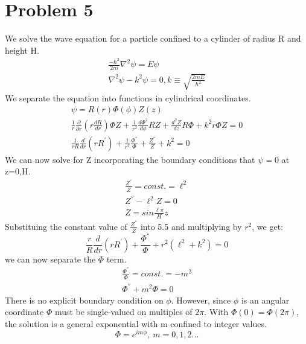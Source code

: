 \documentclass[a4paper,10pt]{article}
\numberwithin{equation}{section}
\begin{document}
\section{Problem 5}
We solve the wave equation for a particle confined to a cylinder of radius R and height H.
\begin{gather}
\frac{-\hbar ^2}{2m} \nabla ^2 \psi=E \psi\\
\nabla ^2 \psi -k^2\psi=0, k\equiv \sqrt{\frac{2mE}{\hbar ^2}}
\end{gather}
We separate the equation into functions in cylindrical coordinates.
\begin{gather}
 \psi=R(r)\Phi(\phi)Z(z)\\
 \frac{1}{r}\frac{\partial}{\partial r}(r\frac{dR}{dr})\Phi Z+\frac{1}{r^2}\frac{d \Phi ^2}{d \phi }RZ+\frac{d^2Z}{dz}R\Phi +k^2r\Phi Z=0\\
 \frac{1}{rR}\frac{d}{dr}(rR^{'} )+\frac{1}{r^2}\frac{\Phi^{''} }{\Phi}+\frac{Z^{''}}{Z}+k^2=0
\end{gather}
We can now solve for Z incorporating the boundary conditions that $\psi=0$ at z=0,H.
\begin{gather}
\frac{Z^{''}}{Z}=const.=\ell ^2\\
 Z^{''}-\ell ^2Z=0\\
 Z=sin\frac{\ell \pi}{H}z
\end{gather}
Substituing the constant value of $\frac{Z^{''}}{Z}$ into 5.5 and multiplying by $r^2$, we get:
\begin{equation}
\frac{r}{R}\frac{d}{dr}(rR^{'})+\frac{\Phi ^{''}}{\Phi}+r^2(\ell ^2+k^2)=0 
\end{equation}
we can now separate the $\Phi$ term.
\begin{gather}
\frac{\Phi ^{''}}{\Phi}=const.=-m^2\\
\Phi ^{''}+m^2\Phi=0
\end{gather}
There is no explicit boundary condition on $\phi$. 
However, since $\phi$ is an angular coordinate $\Phi$ must be single-valued on multiples of $2\pi$. 
With $\Phi(0)=\Phi(2\pi)$, the solution is a general exponential with m confined to integer values.
\begin{equation}
\Phi=e^{im \phi}, \  m=0,1,2...
\end{equation}
\end{document}
